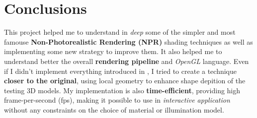 \section{Conclusions}
This project helped me to understand in \textit{deep} some of the simpler and most famouse \textbf{Non-Photorealistic Rendering (NPR)} shading techniques as well as implementing some new strategy to improve them. \newline
It also helped me to understand better the overall \textbf{rendering pipeline} and \textit{OpenGL} language. Even if I didn't implement everything introduced in \cite{referencePaper}, I tried to create a technique \textbf{closer to the original}, using local geometry to enhance shape depition of the testing 3D models. \newline
My implementation is also \textbf{time-efficient}, providing high frame-per-second (fps), making it possible to use in \textit{interactive application} without any constraints on the choice of material or illumination model. 
